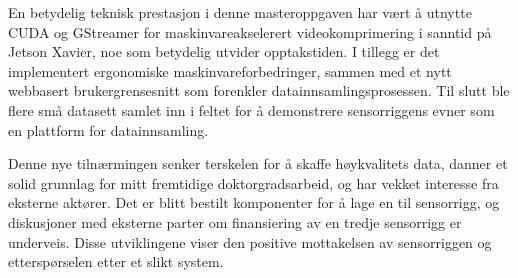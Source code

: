 En betydelig teknisk prestasjon i denne masteroppgaven har vært å utnytte CUDA og GStreamer for maskinvareakselerert videokomprimering i sanntid på Jetson Xavier, noe som betydelig utvider opptakstiden. I tillegg er det implementert ergonomiske maskinvareforbedringer, sammen med et nytt webbasert brukergrensesnitt som forenkler datainnsamlingsprosessen. Til slutt ble flere små datasett samlet inn i feltet for å demonstrere sensorriggens evner som en plattform for datainnsamling.

Denne nye tilnærmingen senker terskelen for å skaffe høykvalitets data, danner et solid grunnlag for mitt fremtidige doktorgradsarbeid, og har vekket interesse fra eksterne aktører. Det er blitt bestilt komponenter for å lage en til sensorrigg, og diskusjoner med eksterne parter om finansiering av en tredje sensorrigg er underveis. Disse utviklingene viser den positive mottakelsen av sensorriggen og etterspørselen etter et slikt system.